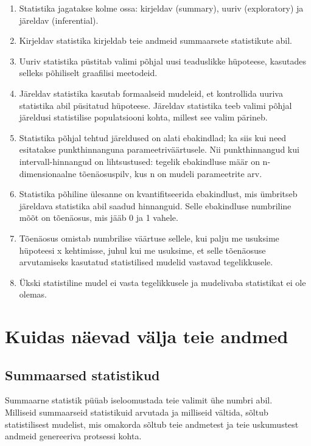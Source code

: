 \documentclass[]{book}
\begin{document}
\begin{enumerate}
\def\labelenumi{\arabic{enumi}.}
\item
  Statistika jagatakse kolme ossa: kirjeldav (summary), uuriv (exploratory) ja järeldav (inferential).
\item
  Kirjeldav statistika kirjeldab teie andmeid summaarsete statistikute abil.
\item
  Uuriv statistika püstitab valimi põhjal uusi teaduslikke hüpoteese, kasutades selleks põhiliselt graafilisi meetodeid.
\item
  Järeldav statistika kasutab formaalseid mudeleid, et kontrollida uuriva statistika abil püsitatud hüpoteese. Järeldav statistika teeb valimi põhjal järeldusi statistilise populatsiooni kohta, millest see valim pärineb.
\item
  Statistika põhjal tehtud järeldused on alati ebakindlad; ka siis kui need esitatakse punkthinnanguna parameetriväärtusele. Nii punkthinnangud kui intervall-hinnangud on lihtsustused: tegelik ebakindluse määr on n-dimensionaalne tõenäosuspilv, kus n on mudeli parameetrite arv.
\item
  Statistika põhiline ülesanne on kvantifitseerida ebakindlust, mis ümbritseb järeldava statistika abil saadud hinnanguid. Selle ebakindluse numbriline mõõt on tõenäosus, mis jääb 0 ja 1 vahele.
\item
  Tõenäosus omistab numbrilise väärtuse sellele, kui palju me usuksime hüpoteesi x kehtimisse, juhul kui me usuksime, et selle tõenäosuse arvutamiseks kasutatud statistilised mudelid vastavad tegelikkusele.
\item
  Ükski statistiline mudel ei vasta tegelikkusele ja mudelivaba statistikat ei ole olemas.
\end{enumerate}

\hypertarget{kuidas-naevad-valja-teie-andmed}{%
\chapter{Kuidas näevad välja teie andmed}\label{kuidas-naevad-valja-teie-andmed}}

\hypertarget{summaarsed-statistikud}{%
\section*{Summaarsed statistikud}\label{summaarsed-statistikud}}

Summaarne statistik püüab iseloomustada teie valimit ühe numbri abil.\\
Milliseid summaarseid statistikuid arvutada ja milliseid vältida, sõltub statistilisest mudelist, mis omakorda sõltub teie andmetest ja teie uskumustest andmeid genereeriva protsessi kohta.
\end{document}

